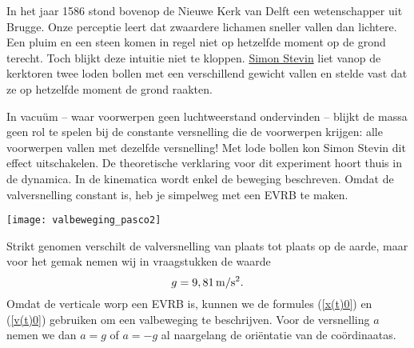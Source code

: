 \documentclass{ximera}
\begin{document}
	\author{Bart Lambregs}
    \xmsource\xmuitleg



 In het jaar 1586 stond bovenop de Nieuwe Kerk van Delft een wetenschapper uit Brugge. Onze perceptie leert dat zwaardere lichamen sneller vallen dan lichtere. Een pluim en een steen komen in regel niet op hetzelfde moment op de grond terecht. Toch blijkt deze intuitie niet te kloppen. \href{https://www.canonvanvlaanderen.be/events/simon-stevin/}{Simon Stevin} liet vanop de kerktoren twee loden bollen met een verschillend gewicht vallen en stelde vast dat ze op hetzelfde moment de grond raakten. 
	

In vacu\"um -- waar voorwerpen geen luchtweerstand ondervinden -- blijkt de massa geen rol te spelen bij de constante versnelling die de voorwerpen krijgen: alle voorwerpen vallen met dezelfde versnelling! Met lode bollen kon Simon Stevin dit effect uitschakelen. De theoretische verklaring voor dit experiment hoort thuis in de dynamica. In de kinematica wordt enkel de beweging beschreven. Omdat de valversnelling constant is, heb je simpelweg met een EVRB te maken.

\begin{image}

\texttt{[image: valbeweging\_pasco2]}
\end{image}
Strikt genomen verschilt de valversnelling van plaats tot plaats op de aarde, maar voor het gemak nemen wij in vraagstukken de waarde
\[g=9,81\rm\,m/s^2.\]
Omdat de verticale worp een EVRB is, kunnen we de formules (\ref{x(t)0}) en (\ref{v(t)0}) gebruiken om een valbeweging te beschrijven. Voor de versnelling $a$ nemen we dan $a=g$ of $a=-g$ al naargelang de oriëntatie van de coördinaatas.




\end{document}
